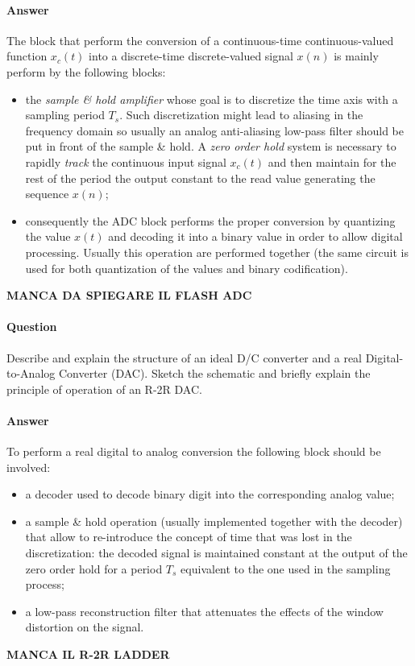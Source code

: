 	
	\paragraph{Answer} The block that perform the conversion of a continuous-time continuous-valued function $x_c(t)$ into  a discrete-time discrete-valued signal $x(n)$ is mainly perform by the following blocks:
	\begin{itemize}
		\item the \textit{sample \& hold amplifier} whose goal is to discretize the time axis with a sampling period $T_s$. Such discretization might lead to aliasing in the frequency domain so usually an analog anti-aliasing low-pass filter should be put in front of the sample \& hold. A \textit{zero order hold} system is necessary to rapidly \textit{track} the continuous input signal $x_c(t)$ and then maintain for the rest of the period the output constant to the read value generating the sequence $x(n)$;
		
		\item consequently the ADC block performs the proper conversion by quantizing the value $x(t)$ and decoding it into a binary value in order to allow digital processing. Usually this operation are performed together (the same circuit is used for both quantization of the values and binary codification).
	\end{itemize}
	
	\textbf{MANCA DA SPIEGARE IL FLASH ADC}

\newquestion
	\paragraph{Question} Describe and explain the structure of an ideal D/C converter and a real Digital-to-Analog Converter (DAC). Sketch the schematic and briefly explain the principle of operation of an R-2R DAC.
	
	\paragraph{Answer} To perform a real digital to analog conversion the following block should be involved:
	\begin{itemize}
		\item a decoder used to decode binary digit into the corresponding analog value;
		
		\item a sample \& hold operation (usually implemented together with the decoder) that allow to re-introduce the concept of time that was lost in the discretization: the decoded signal is maintained constant at the output of the zero order hold for a period $T_s$ equivalent to the one used in the sampling process;
		
		\item a low-pass reconstruction filter that attenuates the effects of the window distortion on the signal.
	\end{itemize}
	\textbf{MANCA IL R-2R LADDER}
	
